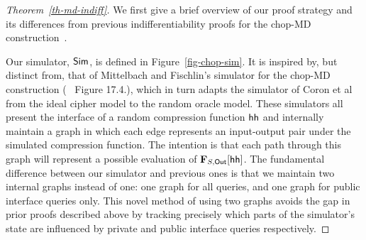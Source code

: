 \begin{proof}[Theorem~\ref{th-md-indiff}]
We first give a brief overview of our proof strategy
and its differences from previous indifferentiability proofs for the chop-MD construction~\cite{C:CDMP05,hfrobook}.

Our simulator, $\mathsf{Sim}$, is defined in Figure~\ref{fig-chop-sim}. 
It is inspired by, but distinct from, that of Mittelbach and Fischlin's simulator for the chop-MD construction (~\cite{hfrobook} Figure 17.4.),
	which in turn adapts the simulator of Coron et al~\cite{C:CDMP05} from the ideal cipher model to the random oracle model.
	These simulators all present the interface of a random compression function $\mathsf{hh}$ and internally maintain a graph
	in which each edge represents an input-output pair under the simulated compression function.
	The intention is that each path through this graph will represent a possible evaluation of $\mathbf{F}_{S, \mathsf{Out}}[\mathsf{hh}]$.
	The fundamental difference between our simulator and previous ones is that we maintain two internal graphs instead of one: one graph for all queries,
	and one graph for public interface queries only.
	This novel method of using two graphs avoids the gap in prior proofs described above by tracking precisely which
	parts of the simulator's state are influenced by private and public interface queries respectively.



\end{proof}
